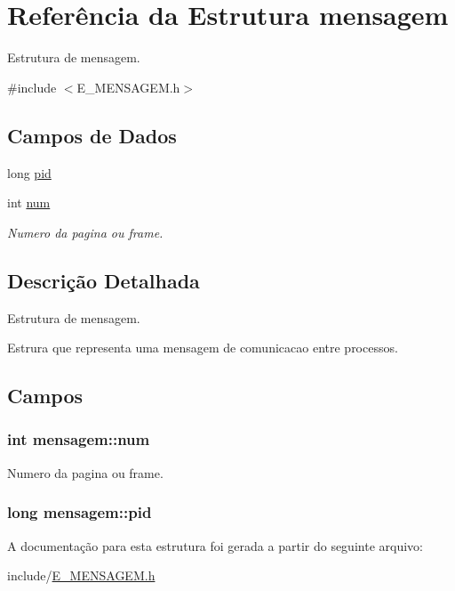 \hypertarget{structmensagem}{}\section{Referência da Estrutura mensagem}
\label{structmensagem}


Estrutura de mensagem.  




{\ttfamily \#include $<$E\+\_\+\+M\+E\+N\+S\+A\+G\+E\+M.\+h$>$}

\subsection*{Campos de Dados}
\begin{DoxyCompactItemize}
\item 
long \hyperlink{structmensagem_a0c2d7145cc186c97a721bf6cc00576be}{pid}
\item 
int \hyperlink{structmensagem_ae517cd66c376c75e1a242660e3892184}{num}
\begin{DoxyCompactList}\small\item\em Numero da pagina ou frame. \end{DoxyCompactList}\end{DoxyCompactItemize}


\subsection{Descrição Detalhada}
Estrutura de mensagem. 

Estrura que representa uma mensagem de comunicacao entre processos. 

\subsection{Campos}
\hypertarget{structmensagem_ae517cd66c376c75e1a242660e3892184}{}
\subsubsection[{num}]{\setlength{\rightskip}{0pt plus 5cm}int mensagem\+::num}\label{structmensagem_ae517cd66c376c75e1a242660e3892184}


Numero da pagina ou frame. 

\hypertarget{structmensagem_a0c2d7145cc186c97a721bf6cc00576be}{}
\subsubsection[{pid}]{\setlength{\rightskip}{0pt plus 5cm}long mensagem\+::pid}\label{structmensagem_a0c2d7145cc186c97a721bf6cc00576be}


A documentação para esta estrutura foi gerada a partir do seguinte arquivo\+:\begin{DoxyCompactItemize}
\item 
include/\hyperlink{_e___m_e_n_s_a_g_e_m_8h}{E\+\_\+\+M\+E\+N\+S\+A\+G\+E\+M.\+h}\end{DoxyCompactItemize}
